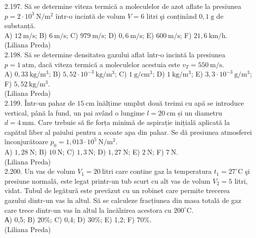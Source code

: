 2.197. Să se determine viteza termică a moleculelor de azot aflate la presiunea $p=2 \cdot 10^{3} \mathrm{~N} / \mathrm{m}^{2}$ într-o incintă de volum $V=6$ litri şi conținând $0,1 \mathrm{~g}$ de substanță.\\ A) $12 \mathrm{~m} / \mathrm{s}$; B) $6 \mathrm{~m} / \mathrm{s}$; C) $979 \mathrm{~m} / \mathrm{s}$; D) $0,6 \mathrm{~m} / \mathrm{s}$; E) $600 \mathrm{~m} / \mathrm{s}$; F) $21,6 \mathrm{~km} / \mathrm{h}$.\\ (Liliana Preda)\\

2.198. Să se determine densitatea gazului aflat într-o incintă la presiunea $p=1 \mathrm{~atm}$, dacă viteza termică a moleculelor acestuia este $v_{T}=550 \mathrm{~m} / \mathrm{s}$.\\ A) $0,33 \mathrm{~kg} / \mathrm{m}^{3}$; B) $5,52 \cdot 10^{-3} \mathrm{~kg} / \mathrm{m}^{3}$; C) $1 \mathrm{~g} / \mathrm{cm}^{3}$; D) $1 \mathrm{~kg} / \mathrm{m}^{3}$; E) $3,3 \cdot 10^{-3} \mathrm{~g} / \mathrm{m}^{3}$; F) $5,52 \mathrm{~kg} / \mathrm{m}^{3}$.\\ (Liliana Preda)\\

2.199. Într-un pahar de $15 \mathrm{~cm}$ înălțime umplut două treimi cu apă se introduce vertical, până la fund, un pai având o lungime $l=20 \mathrm{~cm}$ și un diametru $d=4 \mathrm{~mm}$. Care trebuie să fie forța minimă de aspirație inițială aplicată la capătul liber al paiului pentru a scoate apa din pahar. Se dă presiunea atmosferei înconjurătoare $p_{0}=1,013 \cdot 10^{5} \mathrm{~N} / \mathrm{m}^{2}$.\\ A) $1,28 \mathrm{~N}$; B) $10 \mathrm{~N}$; C) $1,3 \mathrm{~N}$; D) $1,27 \mathrm{~N}$; E) $2 \mathrm{~N}$; F) $7 \mathrm{~N}$.\\ (Liliana Preda)\\

2.200. Un vas de volum $V_{1}=20 \mathrm{~litri}$ care contine gaz la temperatura $t_{1}=27^{\circ} \mathrm{C}$ şi presiune normală, este legat printr-un tub scurt cu alt vas de volum $V_{2}=5$ litri, vidat. Tubul de legătură este prevăzut cu un robinet care permite trecerea gazului dintr-un vas în altul. Să se calculeze fracțiunea din masa totală de gaz care trece dintr-un vas în altul la încălzirea acestora cu $200^{\circ} \mathrm{C}$.\\ А) 0,5; B) $20 \%$; C) 0,4; D) $30 \%$; E) 1,2; F) $70 \%$.\\ (Liliana Preda)\\

